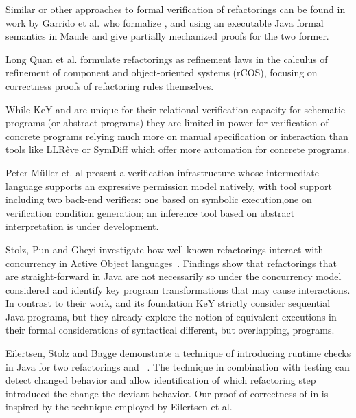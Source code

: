 Similar or other approaches to formal verification of refactorings can be found in work by
Garrido et al. \cite{garrido2006formal} who formalize ,
 and  using an executable
Java formal semantics in Maude and give partially mechanized proofs for the two former.

Long Quan et al. \cite{DBLP:conf/isola/QuanQL08} formulate refactorings as refinement
laws in the calculus of refinement of component and object-oriented systems (rCOS),
focusing on correctness proofs of refactoring rules themselves.

While KeY and \Refinity{} are unique for their relational verification capacity for
schematic programs (or abstract programs) they are limited in power for verification
of concrete programs relying much more on manual specification or interaction \cite{DBLP:conf/aplas/Steinhofel20}
than tools like LLRêve \cite{DBLP:journals/jar/KieferKU18} or SymDiff \cite{DBLP:conf/cav/LahiriHKR12}
which offer more automation for concrete programs.

Peter M{\"u}ller et. al present a verification infrastructure whose intermediate language supports
an expressive permission model natively, with tool support including two back-end verifiers: one based on
symbolic execution,one on verification condition generation; an inference tool based on abstract
interpretation is  under development. \cite{DBLP:series/natosec/0001SS17}

Stolz, Pun and Gheyi investigate how well-known refactorings interact with concurrency in Active Object languages~\cite{DBLP:conf/isola/StolzPG20}.
Findings show that refactorings that are straight-forward in Java are not necessarily so under the concurrency model considered and identify key
program transformations that may cause interactions.
In contrast to their work, \Refinity{} and its foundation KeY strictly consider sequential Java programs,
but they already explore the notion of equivalent executions in their formal considerations of syntactical different, but overlapping, programs.

Eilertsen, Stolz and Bagge demonstrate a technique of introducing runtime checks in Java for two refactorings  and
~\cite{stolz:isolarefa}. The technique in combination with testing can detect changed behavior and allow identification
of which refactoring step introduced the change the deviant behavior.
Our proof of correctness of  in \Refinity{} is inspired by the technique employed by Eilertsen et al.


